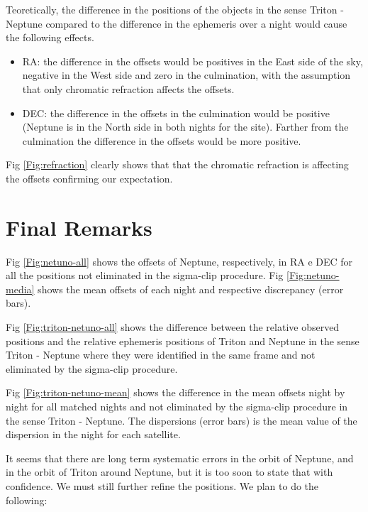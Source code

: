 \documentclass[12pt,a4paper]{report}
\begin{document}
Teoretically, the difference in the positions of the objects in the sense Triton - Neptune compared to the difference in the ephemeris over a night would cause the following effects.

\begin{itemize}
\item RA: the difference in the offsets would be positives in the East side of the sky, negative in the West side and zero in the culmination, with the assumption that only chromatic refraction affects the offsets.
\item DEC: the difference in the offsets in the culmination would be positive (Neptune is in the North side in both nights for the site). Farther from the culmination the difference in the offsets would be more positive.
\end{itemize}

Fig \ref{Fig:refraction} clearly shows that that the chromatic refraction is affecting the offsets confirming our expectation.

\section*{Final Remarks}

Fig \ref{Fig:netuno-all} shows the offsets of Neptune, respectively, in RA e DEC for all the positions not eliminated in the sigma-clip procedure. Fig \ref{Fig:netuno-media} shows the mean offsets of each night and respective discrepancy (error bars).

Fig \ref{Fig:triton-netuno-all} shows the difference between the relative observed positions and the relative ephemeris positions of Triton and Neptune in the sense Triton - Neptune where they were identified in the same frame and not eliminated by the sigma-clip procedure.

Fig \ref{Fig:triton-netuno-mean} shows the difference in the mean offsets night by night for all matched nights and not eliminated by the sigma-clip procedure in the sense Triton - Neptune. The dispersions (error bars) is the mean value of the dispersion in the night for each satellite.



It seems that there are long term systematic errors in the orbit of Neptune, and in the orbit of Triton around Neptune, but it is too soon to state that with confidence. We must still further refine the positions. We plan to do the following:
\end{document}
